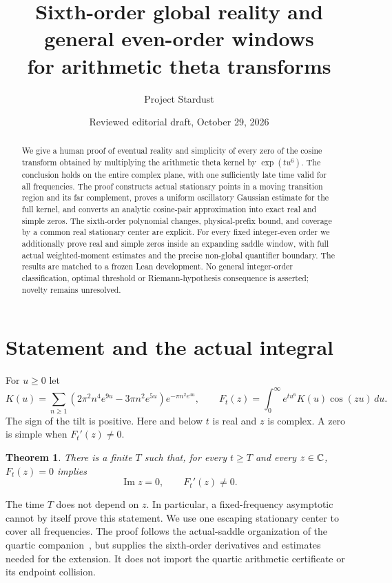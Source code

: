 \documentclass[11pt]{article}
\title{Sixth-order global reality and general even-order windows\protect\\for arithmetic theta transforms}
\author{Project Stardust}
\date{Reviewed editorial draft, October 29, 2026}
\newtheorem{theorem}{Theorem}[section]
\begin{document}
\maketitle
\begin{abstract}
We give a human proof of eventual reality and simplicity of
every zero of the cosine transform obtained by multiplying
the arithmetic theta kernel by $\exp(tu^6)$. The conclusion
holds on the entire complex plane, with one sufficiently
late time valid for all frequencies. The proof constructs
actual stationary points in a moving transition region and
its far complement, proves a uniform oscillatory Gaussian
estimate for the full kernel, and converts an analytic
cosine-pair approximation into exact real and simple zeros.
The sixth-order polynomial changes, physical-prefix bound,
and coverage by a common real stationary center are explicit.
For every fixed integer-even order we additionally prove real and simple zeros inside an expanding saddle window, with full actual weighted-moment estimates and the precise non-global quantifier boundary. The results are matched to a frozen Lean development.
No general integer-order classification, optimal threshold
or Riemann-hypothesis consequence is asserted; novelty remains
unresolved.
\end{abstract}

\section{Statement and the actual integral}
For $u\geq0$ let
\begin{equation}\label{eq:kernel}
 K(u)=\sum_{n\geq1}
 (2\pi^2 n^4e^{9u}-3\pi n^2e^{5u})e^{-\pi n^2e^{4u}},
 \qquad
 F_t(z)=\int_0^\infty e^{tu^6}K(u)\cos(zu)\,du.
\end{equation}
The sign of the tilt is positive. Here and below $t$ is real
and $z$ is complex. A zero is simple when $F_t'(z)\ne0$.

\begin{theorem}\label{thm:main}
There is a finite $T$ such that, for every $t\geq T$ and
every $z\in\mathbb C$, $F_t(z)=0$ implies
\[
 \operatorname{Im}z=0,\qquad F_t'(z)\ne0.
\]
\end{theorem}

The time $T$ does not depend on $z$. In particular, a
fixed-frequency asymptotic cannot by itself prove this
statement. We use one escaping stationary center to cover
all frequencies. The proof follows the actual-saddle
organization of the quartic companion~\cite{quartic}, but
supplies the sixth-order derivatives and estimates needed
for the extension. It does not import the quartic arithmetic
certificate or its endpoint collision.
\end{document}

